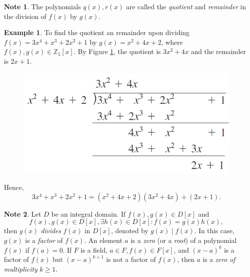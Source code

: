 \documentclass{article}
\newtheorem{corollary}{Corollary}[theorem]
\theoremstyle{definition}
\newtheorem{example}{Example}[section]
\newtheorem{note}{Note}[section]
\begin{document}
\begin{note}
    The polynomials $q(x),r(x)$ are called the \textit{quotient} and \textit{remainder} in the division of $f(x)$ by $g(x)$.
\end{note}

\begin{example}
    To find the quotient an remainder upon dividing $f(x)=3x^4+x^3+2x^2+1$ by $g(x)=x^2+4x+2$, where $f(x),g(x)\in \mathbb{Z}_5[x]$. By Figure \ref{longdiv}, the quotient is $3x^2+4x$ and the remainder is $2x+1$.
    
    \begin{figure}[!htbp]
        \centering
        \includegraphics[width=0.55\linewidth]{figures/longdiv.png}
        \caption{}
        \label{longdiv}
    \end{figure}
    
    Hence,
    \begin{equation*}
        3x^4+x^3+2x^2+1=(x^2+4x+2)(3x^2+4x)+(2x+1).
    \end{equation*}
\end{example}

\begin{note}
    Let $D$ be an integral domain. If $f(x),g(x)\in D[x]$ and \begin{equation*}
        f(x),g(x)\in D[x], \exists h(x)\in D[x]: f(x)=g(x)h(x),
    \end{equation*}
    then $g(x)$ \textit{divides} $f(x)$ in $D[x]$, denoted by $g(x)\mid f(x)$. In this case, $g(x)$ is a \textit{factor} of $f(x)$. An element $a$ is a \textit{zero} (or a \textit{root}) of a polynomial $f(x)$ if $f(a)=0$. If $F$ is a field, $a\in F, f(x)\in F[x]$, and $(x-a)^k$ is a factor of $f(x)$ but $(x-a)^{k+1}$ is not a factor of $f(x)$, then $a$ is a \textit{zero of multiplicity} $k\geq1$. 
\end{note}

\noindent{}
\end{document}
